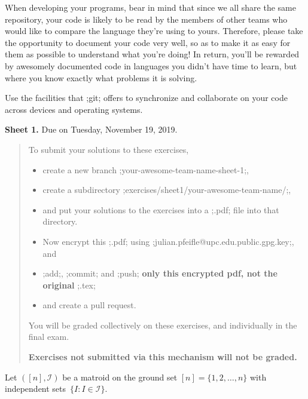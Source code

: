 \documentclass[11pt]{amsart}
\newcommand{\alert}[1]{\textbf{\color{red}#1}}
\begin{document}
\begin{enumerate}
  \smallskip
  When developing your programs, bear in mind that since we all share the same repository,
  your code is likely to be read by the members of other teams who would like to compare the language they're using to yours.
  Therefore, please take the opportunity to document your code very well, so as to make it as easy for them as possible to understand what you're doing!
  In return, you'll be rewarded by awesomely documented code in languages you didn't have time to learn, but where you know exactly what problems it is solving.

  \smallskip
  Use the facilities that ;git; offers to synchronize and collaborate on your code across devices and operating systems.
\end{enumerate}

\newpage
\begin{center}
  \textbf{\sffamily Sheet 1.}
\qquad
Due on Tuesday, November 19, 2019.
\end{center}

\bigskip


\begin{quote}\small
  To submit your solutions to these exercises,
  \begin{itemize}[$\quad\triangleright$]
  \item create a new branch ;your-awesome-team-name-sheet-1;,
  \item create a subdirectory ;exercises/sheet1/your-awesome-team-name/;,
  \item and put your solutions to the exercises into a ;.pdf; file into that directory.
  \item Now encrypt this ;.pdf; using ;julian.pfeifle@upc.edu.public.gpg.key;, and
  \item ;add;, ;commit; and ;push; \alert{only this encrypted pdf, not the original} ;.tex;
  \item and create a pull request.
  \end{itemize}
  You will be graded collectively on these exercises, and individually in the final exam.

  \alert{Exercises not submitted via this mechanism will not be graded.}
\end{quote}

\bigskip

Let $([n],\mathcal I)$ be a matroid on the ground set $[n]=\{1,2,\dots,n\}$ with independent sets~$\{I:I\in\mathcal I\}$.
\end{document}
